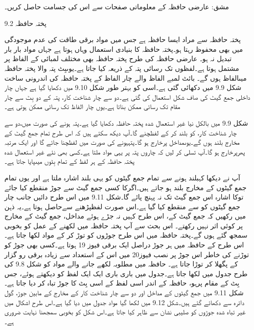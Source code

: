 مشق:	عارضی حافظہ کے معلوماتی صفحات سے اس کی جسامت حاصل کریں۔

9.2 پختہ حافظہ

	پختہ حافظہ سے مراد ایسا حافظہ ہے جس میں مواد برقی طاقت کی عدم موجودگی میں بھی محفوظ رہتا ہو۔پختہ حافظہ کا بنیادی استعمال وہاں ہوتا ہے جہاں مواد بار بار تبدیل نہ ہو۔
	عارضی حافظہ کی طرح پختہ حافظہ بھی مختلف لمبائی کے الفاظ پر مشتمل ہوتا ہے۔لفظوں تک رسائی پتہ کے ذریعہ کیا جاتا ہے۔یوںبِٹ پتہ والا پختہ حافظہ میںالفاظ ہوں گے۔
	بائٹ لمبے الفاظ والے چار الفاظ کے پختہ حافظہ کی اندرونی ساخت شکل 9.9 میں دکھائی گئی ہے۔اسی کو بہتر طور شکل 9.10 میں دکھایا گیا ہے جہاں چار داخلی جمع گیٹ کی صاف شکل استعمال کی گئی ہے۔دو سے چار شناخت کار، پتہ کے دو بِٹ سے چار مقام تک رسائی ممکن بناتا ہے۔یوں چار الفاظ تک رسائی ممکن ہوتی ہے۔


	شکل 9.9 میں بالکل نیا غیر استعمال شدہ پختہ حافظہ دکھایا گیا ہے۔پتہ  ہونے کی صورت میں،دو سے چار شناخت کار، کو بلند کر کے لفظچنے گا۔آپ دیکھ سکتے ہیں کہ اس طرح تمام جمع گیٹ کے مخارج بلند ہوں گے۔یوںمداخل پرخارج ہو گا۔پتہہونے کی صورت میں لفظچنا جائے گا اور ایک مرتبہ پھرپرخارج ہو گا۔آپ تسلی کر لیں کہ چاروں پتہ پر یہی مواد ملتا ہے۔کسی بھی نئے غیر استعمال شدہ پختہ حافظہ کے ہر لفظ کے تمام بِٹوں میںپایا جاتا ہے۔


	آپ نے دیکھا کہبلند ہونے سے تمام جمع گیٹوں کو یہی بلند اشارہ ملتا ہے اور یوں تمام جمع گیٹوں کے مخارج بلند ہو جاتے ہیں۔اگرکا کسی جمع گیٹ سے جوڑ منقطع کیا جائے توکا اشارہ اس جمع گیٹ تک نہ پہنچ پائے گا۔شکل 9.11 میں اس طرح دائیں جانب چار جمع گیٹوں کو سے منقطع کیا گیا ہے۔اس صورت لفظپڑھنے سےحاصل ہوتا ہے۔یہ ذہن میں رکھیں کہ جمع گیٹ کے، اس طرح کہیں نہ جڑے ہوئے مداخل، جمع گیٹ کے مخارج پر کوئی اثر نہیں رکھتے۔
	اس بحث سے آپ پختہ حافظہ میں لکھنے کے عمل کو بخوبی سمجھ گئے ہوں گے۔پختہ حافظہ میں اس طرح جوڑوں کو توڑ کر کے مواد لکھا جاتا ہے۔اس طرح کے حافظہ میں ہر جوڑ دراصل ایک برقی فیوز 19 ہوتا ہے۔کسی بھی جوڑ کو توڑنے کی خاطر اس جوڑ پر نصب فیوز20 میں اس کے استعداد سے زیادہ برقی رو گزار کے پگھلا کر توڑا جاتا ہے۔
	حافظہ میں مطلوبہ لکھے جانے والے مواد کو شکل 9.8 کی طرح جدول میں لکھا جاتا ہے۔جدول میں باری باری ایک ایک لفظ کو دیکھتے ہوئے، جس بِٹ کے مقام پرہو، حافظہ کے اندر اسی لفظ کے اسی بِٹ کا جوڑ تباہ کر دیا جاتا ہے۔
	شکل 9.11 میں  جمع گیٹوں کے مداخل اور دو سے چار شناخت کار کے مخارج کے مابین جوڑ، گول دائرہ سے دکھائے گئے ہیں۔شکل 9.12 میں لکھا گیا مواد جدول میں دیا گیا ہے۔اس طرح اشکال میں غیر تباہ شدہ جوڑوں کو صلیبی نشان سے ظاہر کیا جاتا ہے۔اس شکل کو بخوبی سمجھنا نہایت ضروری ہے۔

